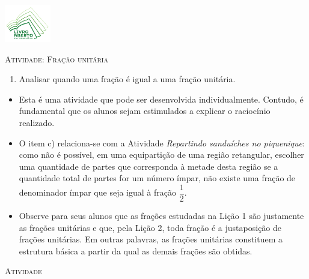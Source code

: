 \documentclass[10 pt,usenames,dvipsnames, oneside]{article}
\begin{document}
\begin{center}
  \begin{minipage}[l]{3cm}
\includegraphics[width=2cm]{../../../Figuras/logo}       
\end{minipage}\hfill
\begin{minipage}[r]{.8\textwidth}
 {\Large \scshape Atividade: Fração unitária}  
\end{minipage}
\end{center}
\vspace{.2cm}

\ifdefined\prof
\begin{goals}
\begin{enumerate}
\item       Analisar quando uma fração é igual a uma fração unitária.
\end{enumerate}

\tcblower

\begin{itemize}
\item       Esta é uma atividade que pode ser desenvolvida individualmente.
Contudo, é fundamental que os alunos sejam estimulados a explicar o raciocínio
realizado.
    \item       O item c) relaciona-se com a Atividade \textit{Repartindo sanduíches no piquenique}: como não é possível,
em uma equipartição de uma região retangular, escolher uma quantidade de partes
que corresponda à metade desta região se a quantidade total de partes for um
número ímpar, não existe uma fração de denominador ímpar que seja igual à fração
      $\dfrac{1}{2}$.
    \item       Observe para seus alunos que as frações estudadas na Lição 1 são
justamente as frações unitárias e que, pela Lição 2, toda fração é a
justaposição de frações unitárias. Em outras palavras, as frações unitárias
constituem a estrutura básica a partir da qual as demais frações são obtidas.
\end{itemize}
\end{goals}

\bigskip
\begin{center}
{\large \scshape Atividade}
\end{center}
\fi
\end{document}
